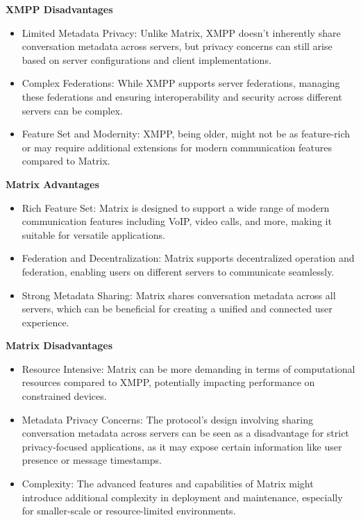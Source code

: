 \textbf{XMPP Disadvantages}
\begin{itemize}
\item Limited Metadata Privacy: Unlike Matrix, XMPP doesn’t inherently share conversation metadata across servers, but privacy concerns can still arise based on server configurations and client implementations.
\item Complex Federations: While XMPP supports server federations, managing these federations and ensuring interoperability and security across different servers can be complex.
\item Feature Set and Modernity: XMPP, being older, might not be as feature-rich or may require additional extensions for modern communication features compared to Matrix.
\end{itemize}

\textbf{Matrix Advantages}
\begin{itemize}
\item Rich Feature Set: Matrix is designed to support a wide range of modern communication features including VoIP, video calls, and more, making it suitable for versatile applications.
\item Federation and Decentralization: Matrix supports decentralized operation and federation, enabling users on different servers to communicate seamlessly.
\item Strong Metadata Sharing: Matrix shares conversation metadata across all servers, which can be beneficial for creating a unified and connected user experience.
\end{itemize}

\textbf{Matrix Disadvantages}
\begin{itemize}

\item Resource Intensive: Matrix can be more demanding in terms of computational resources compared to XMPP, potentially impacting performance on constrained devices.
\item Metadata Privacy Concerns: The protocol’s design involving sharing conversation metadata across servers can be seen as a disadvantage for strict privacy-focused applications, as it may expose certain information like user presence or message timestamps.
\item Complexity: The advanced features and capabilities of Matrix might introduce additional complexity in deployment and maintenance, especially for smaller-scale or resource-limited environments.
\end{itemize}

